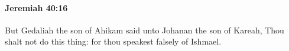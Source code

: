 
		\paragraph{Jeremiah 40:16} %
			\label{JEREMIAH-40-16}

			But Gedaliah the son of Ahikam said unto Johanan the son of Kareah, Thou shalt not do this thing: for thou speakest falsely of Ishmael.

